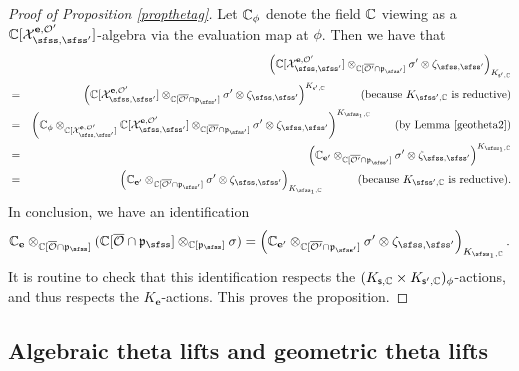 \documentclass[12pt,a4paper]{amsart}
\newcommand{\CO}{{\mathcal {O}}}
\newcommand{\CX}{{\mathcal {X}}}
\newcommand{\p}{\mathfrak p}
\numberwithin{equation}{section}
\theoremstyle{remark}
\begin{document}
\begin{proof}[Proof of Proposition \ref{propthetag}]
 Let $\mathbb{C}_\phi$ denote the field $\mathbb{C}$ viewing as a $\C[\CX_{\sfss, \sfss'}^{\mathbf e, \CO'}]$-algebra via the evaluation map at $\phi$. Then we have that
\begin{eqnarray*}
      &&\left( \C[\CX_{\sfss, \sfss'}^{\mathbf e, \CO'}] \otimes_{\C[\overline{\CO'}\cap \p_{\sfss'}]}\sigma'\otimes \zeta_{\sfss, \sfss'}\right)_{K_{\mathsf s', \C}}\\
             &=&\left( \C[\CX_{\sfss, \sfss'}^{\mathbf e, \CO'}] \otimes_{\C[\overline{\CO'}\cap \p_{\sfss'}]}\sigma'\otimes \zeta_{\sfss, \sfss'}\right)^{K_{\mathsf s', \C}}\quad \qquad (\textrm{because $K_{\sfss',\C}$ is reductive})\\
             &=&\left( \C_\phi\otimes_{\C[\CX_{\sfss, \sfss'}^{\mathbf e, \CO'}]} \C[\CX_{\sfss, \sfss'}^{\mathbf e, \CO'}] \otimes_{\C[\overline{\CO'}\cap \p_{\sfss'}]}\sigma'\otimes \zeta_{\sfss, \sfss'}\right)^{K_{\sfss_1,\C}} \qquad (\textrm{by Lemma \ref{geotheta2}})\\ 
               &=&\left( \C_{\mathbf e'}  \otimes_{\C[\overline{\CO'}\cap \p_{\sfss'}]}\sigma'\otimes \zeta_{\sfss, \sfss'}\right)^{K_{\sfss_1, \C}}\\ 
                 &=&\left( \C_{\mathbf e'}  \otimes_{\C[\overline{\CO'}\cap \p_{\sfss'}]}\sigma'\otimes \zeta_{\sfss, \sfss'}\right)_{K_{\sfss_1, \C}} \quad \qquad (\textrm{because $K_{\sfss',\C}$ is reductive}).
\end{eqnarray*}
In conclusion, we have an identification
\[
\C_\mathbf e \otimes_{\C[\overline \CO\cap \p_{\sfss}]} (\C[\overline \CO\cap \p_{\sfss}]\otimes_{\C[\p_{\sfss}]} \sigma)=\left( \C_{\mathbf e'}  \otimes_{\C[\overline{\CO'}\cap \p_{\sfss'}]}\sigma'\otimes \zeta_{\sfss, \sfss'}\right)_{K_{\sfss_1, \C}}.
\]
It is routine to check that this identification respects the $(K_{\mathsf s,\mathbb{C}}\times K_{\mathsf s', \mathbb{C}})_\phi$-actions, and thus respects the $K_{\mathbf e}$-actions. This proves the proposition. 
\end{proof}


\subsection{Algebraic theta lifts and  geometric theta lifts}
\end{document}
